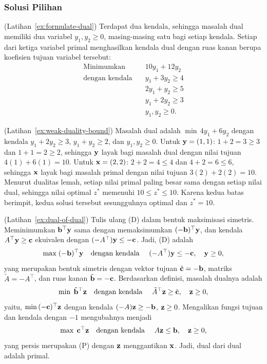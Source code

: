 \subsubsection*{Solusi Pilihan}

\begin{solution}(Latihan~\ref{ex:formulate-dual})
Terdapat dua kendala, sehingga masalah dual memiliki dua variabel $y_1, y_2 \geq 0$, masing-masing satu bagi setiap kendala. Setiap dari ketiga variabel primal menghasilkan kendala dual dengan ruas kanan berupa koefisien tujuan variabel tersebut:
\[
\begin{aligned}
\text{Minimumkan} \quad & 10y_1 + 12y_2 \\
\text{dengan kendala} \quad
& y_1 + 3y_2 \geq 4 \\
& 2y_1 + y_2 \geq 5 \\
& y_1 + 2y_2 \geq 3 \\
& y_1, y_2 \geq 0.
\end{aligned}
\]
\end{solution}

\begin{solution}(Latihan~\ref{ex:weak-duality-bound})
Masalah dual adalah $\min\, 4y_1 + 6y_2$ dengan kendala $y_1 + 2y_2 \geq 3$, $y_1 + y_2 \geq 2$, dan $y_1, y_2 \geq 0$.
Untuk $\mathbf{y} = (1,1)$: $1 + 2 = 3 \geq 3$ dan $1 + 1 = 2 \geq 2$, sehingga $\mathbf{y}$ layak bagi masalah dual dengan nilai tujuan $4(1) + 6(1) = 10$.
Untuk $\mathbf{x} = (2,2)$: $2 + 2 = 4 \leq 4$ dan $4 + 2 = 6 \leq 6$, sehingga $\mathbf{x}$ layak bagi masalah primal dengan nilai tujuan $3(2) + 2(2) = 10$.
Menurut dualitas lemah, setiap nilai primal paling besar sama dengan setiap nilai dual, sehingga nilai optimal $z^*$ memenuhi $10 \leq z^* \leq 10$. Karena kedua batas berimpit, kedua solusi tersebut sesungguhnya optimal dan $z^* = 10$.
\end{solution}

\begin{solution}(Latihan~\ref{ex:dual-of-dual})
Tulis ulang (D) dalam bentuk maksimisasi simetris. Meminimumkan $\mathbf{b}^\top \mathbf{y}$ sama dengan memaksimumkan $(-\mathbf{b})^\top \mathbf{y}$, dan kendala $A^\top \mathbf{y} \geq \mathbf{c}$ ekuivalen dengan $(-A^\top)\mathbf{y} \leq -\mathbf{c}$. Jadi, (D) adalah
\[
\max \; (-\mathbf{b})^\top \mathbf{y} \quad \mbox{dengan kendala } \quad (-A^\top)\mathbf{y} \leq -\mathbf{c}, \quad \mathbf{y} \geq 0,
\]
yang merupakan bentuk simetris dengan vektor tujuan $\tilde{\mathbf{c}} = -\mathbf{b}$, matriks $\tilde{A} = -A^\top$, dan ruas kanan $\tilde{\mathbf{b}} = -\mathbf{c}$. Berdasarkan definisi, masalah dualnya adalah
\[
\min \; \tilde{\mathbf{b}}^\top \mathbf{z} \quad \mbox{dengan kendala } \quad \tilde{A}^\top \mathbf{z} \geq \tilde{\mathbf{c}}, \quad \mathbf{z} \geq 0,
\]
yaitu, $\min\, (-\mathbf{c})^\top \mathbf{z}$ dengan kendala $(-A)\mathbf{z} \geq -\mathbf{b}$, $\mathbf{z} \geq 0$. Mengalikan fungsi tujuan dan kendala dengan $-1$ mengubahnya menjadi
\[
\max \; \mathbf{c}^\top \mathbf{z} \quad \mbox{dengan kendala } \quad A\mathbf{z} \leq \mathbf{b}, \quad \mathbf{z} \geq 0,
\]
yang persis merupakan (P) dengan $\mathbf{z}$ menggantikan $\mathbf{x}$. Jadi, dual dari dual adalah primal.
\end{solution}
